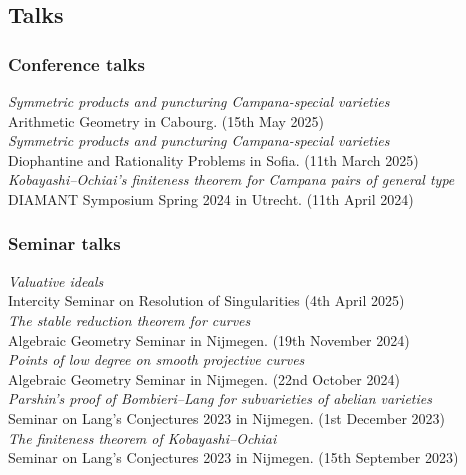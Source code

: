 \documentclass[paper=a4,fontsize=10pt,DIV=10,BCOR=3mm,pdftex]{scrartcl}
\begin{document}
\subsection*{Talks}

\subsubsection*{Conference talks}

\textit{Symmetric products and puncturing Campana-special varieties} \\
Arithmetic Geometry in Cabourg. (15th May 2025) \\

\textit{Symmetric products and puncturing Campana-special varieties} \\
Diophantine and Rationality Problems in Sofia. (11th March 2025) \\

\textit{Kobayashi--Ochiai’s finiteness theorem for Campana pairs of general type} \\
DIAMANT Symposium Spring 2024 in Utrecht. (11th April 2024) \\

\subsubsection*{Seminar talks}

\textit{Valuative ideals} \\
Intercity Seminar on Resolution of Singularities (4th April 2025) \\

\textit{The stable reduction theorem for curves} \\
Algebraic Geometry Seminar in Nijmegen. (19th November 2024) \\

\textit{Points of low degree on smooth projective curves} \\
Algebraic Geometry Seminar in Nijmegen. (22nd October 2024) \\

\textit{Parshin's proof of Bombieri--Lang for subvarieties of abelian varieties} \\
Seminar on Lang's Conjectures 2023 in Nijmegen. (1st December 2023) \\

\textit{The finiteness theorem of Kobayashi--Ochiai} \\
Seminar on Lang's Conjectures 2023 in Nijmegen. (15th September 2023)
\end{document}
